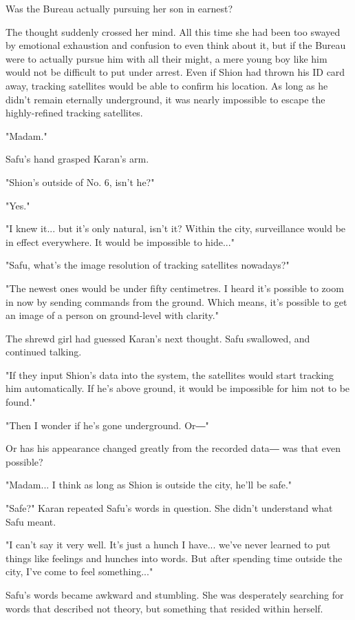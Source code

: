 Was the Bureau actually pursuing her son in earnest?

The thought suddenly crossed her mind. All this time she had been too
swayed by emotional exhaustion and confusion to even think about it, but
if the Bureau were to actually pursue him with all their might, a mere
young boy like him would not be difficult to put under arrest. Even if
Shion had thrown his ID card away, tracking satellites would be able to
confirm his location. As long as he didn't remain eternally underground,
it was nearly impossible to escape the highly-refined tracking
satellites.

"Madam."

Safu's hand grasped Karan's arm.

"Shion's outside of No. 6, isn't he?"

"Yes."

"I knew it... but it's only natural, isn't it? Within the city,
surveillance would be in effect everywhere. It would be impossible to
hide..."

"Safu, what's the image resolution of tracking satellites nowadays?"

"The newest ones would be under fifty centimetres. I heard it's possible
to zoom in now by sending commands from the ground. Which means, it's
possible to get an image of a person on ground-level with clarity."

The shrewd girl had guessed Karan's next thought. Safu swallowed, and
continued talking.

"If they input Shion's data into the system, the satellites would start
tracking him automatically. If he's above ground, it would be impossible
for him not to be found."

"Then I wonder if he's gone underground. Or―"

Or has his appearance changed greatly from the recorded data― was that
even possible?

"Madam... I think as long as Shion is outside the city, he'll be safe."

"Safe?" Karan repeated Safu's words in question. She didn't understand
what Safu meant.

"I can't say it very well. It's just a hunch I have... we've never
learned to put things like feelings and hunches into words. But after
spending time outside the city, I've come to feel something..."

Safu's words became awkward and stumbling. She was desperately searching
for words that described not theory, but something that resided within
herself.

